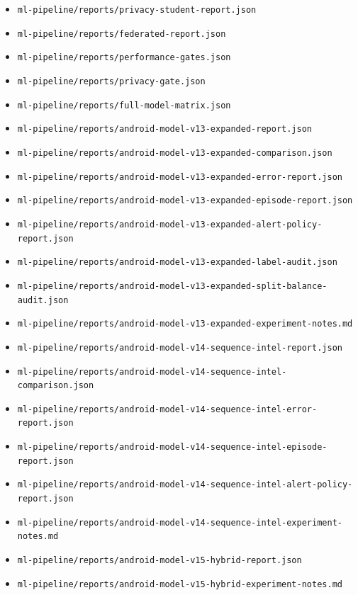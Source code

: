 {\begin{itemize}[leftmargin=*]
  \item \texttt{ml-pipeline/reports/privacy-student-report.json}
  \item \texttt{ml-pipeline/reports/federated-report.json}
  \item \texttt{ml-pipeline/reports/performance-gates.json}
  \item \texttt{ml-pipeline/reports/privacy-gate.json}
  \item \texttt{ml-pipeline/reports/full-model-matrix.json}
  \item \texttt{ml-pipeline/reports/android-model-v13-expanded-report.json}
  \item \texttt{ml-pipeline/reports/android-model-v13-expanded-comparison.json}
  \item \texttt{ml-pipeline/reports/android-model-v13-expanded-error-report.json}
  \item \texttt{ml-pipeline/reports/android-model-v13-expanded-episode-report.json}
  \item \texttt{ml-pipeline/reports/android-model-v13-expanded-alert-policy-report.json}
  \item \texttt{ml-pipeline/reports/android-model-v13-expanded-label-audit.json}
  \item \texttt{ml-pipeline/reports/android-model-v13-expanded-split-balance-audit.json}
  \item \texttt{ml-pipeline/reports/android-model-v13-expanded-experiment-notes.md}
  \item \texttt{ml-pipeline/reports/android-model-v14-sequence-intel-report.json}
  \item \texttt{ml-pipeline/reports/android-model-v14-sequence-intel-comparison.json}
  \item \texttt{ml-pipeline/reports/android-model-v14-sequence-intel-error-report.json}
  \item \texttt{ml-pipeline/reports/android-model-v14-sequence-intel-episode-report.json}
  \item \texttt{ml-pipeline/reports/android-model-v14-sequence-intel-alert-policy-report.json}
  \item \texttt{ml-pipeline/reports/android-model-v14-sequence-intel-experiment-notes.md}
  \item \texttt{ml-pipeline/reports/android-model-v15-hybrid-report.json}
  \item \texttt{ml-pipeline/reports/android-model-v15-hybrid-experiment-notes.md}
\end{itemize}
}

